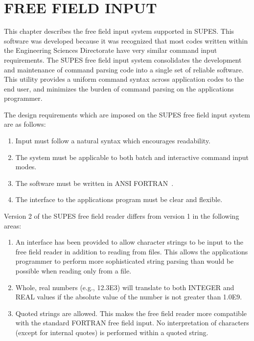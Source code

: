 \chapter{FREE FIELD INPUT}
This chapter describes the free field input system supported in SUPES.  This
software was developed because it was recognized that most codes written
within the Engineering Sciences Directorate have very similar command input
requirements.  The SUPES free field input system consolidates the
development and maintenance of command parsing code into a single set of
reliable software.  This utility provides a uniform command syntax across
application codes to the end user, and minimizes the burden of command
parsing on the applications programmer.

The design requirements which are imposed on the SUPES free field input
system are as follows:
\begin{enumerate}
\item Input must follow a natural syntax which encourages readability.

\item The system must be applicable to both batch and interactive command
input modes.

\item The software must be written in ANSI FORTRAN~\cite{ansi}.

\item The interface to the applications program must be clear and
flexible.
\end{enumerate}

Version 2 of the SUPES free field reader differs from version 1 in the
following areas:
\begin{enumerate}
\item An interface has been provided to allow character strings to be input
to the free field reader in addition to reading from files. This allows the
applications programmer to perform more sophisticated string parsing than
would be possible when reading only from a file.

\item Whole, real numbers (e.g., 12.3E3) will translate to both INTEGER and
REAL values if the absolute value of the number is not greater than 
1.0E9.

\item Quoted strings are allowed. This makes the free field reader more
compatible with the standard FORTRAN free field input. No interpretation of
characters (except for internal quotes) is performed within a quoted string.

\end{enumerate}

